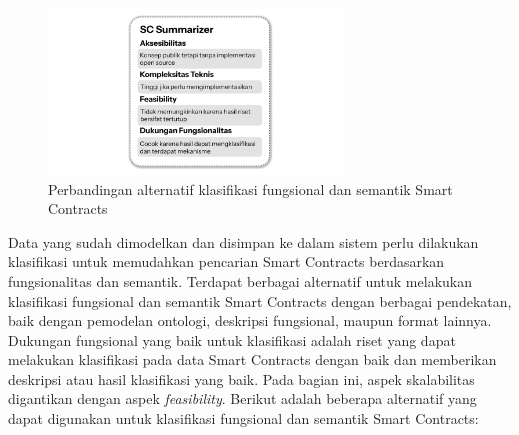 \begin{figure}[ht]
	\centering
	\includegraphics[width=0.7\textwidth]{resources/chapter-3/klasifikasi - 4.png}
	\caption{Perbandingan alternatif klasifikasi fungsional dan semantik Smart Contracts}
	\label{image:klasifikasi-4}
\end{figure}

Data yang sudah dimodelkan dan disimpan ke dalam sistem perlu dilakukan klasifikasi untuk memudahkan pencarian Smart Contracts berdasarkan fungsionalitas dan semantik. Terdapat berbagai alternatif untuk melakukan klasifikasi fungsional dan semantik Smart Contracts dengan berbagai pendekatan, baik dengan pemodelan ontologi, deskripsi fungsional, maupun format lainnya. Dukungan fungsional yang baik untuk klasifikasi adalah riset yang dapat melakukan klasifikasi pada data Smart Contracts dengan baik dan memberikan deskripsi atau hasil klasifikasi yang baik. Pada bagian ini, aspek skalabilitas digantikan dengan aspek \textit{feasibility}. Berikut adalah beberapa alternatif yang dapat digunakan untuk klasifikasi fungsional dan semantik Smart Contracts:

